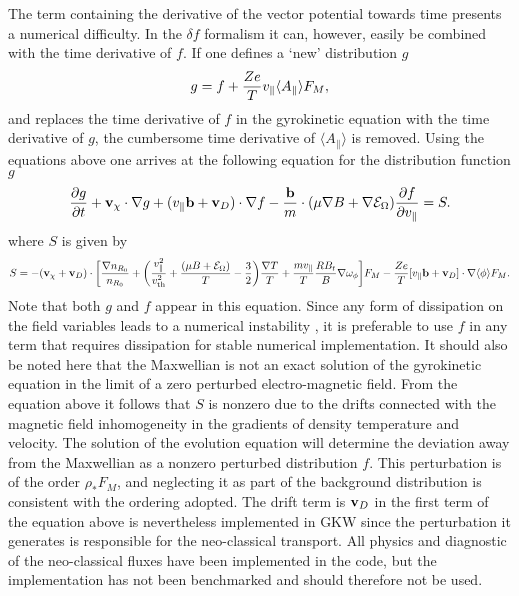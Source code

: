 The term containing the derivative of the vector potential towards time presents a numerical difficulty. 
In the $\delta f$ formalism it can, however, easily be combined with the time derivative of $f$. If one defines a `new' distribution $g$ 
\begin{equation} 
g = f + {Z e \over T} v_\parallel \langle A_\parallel \rangle F_M ,
\end{equation}
and replaces the time derivative of $f$ in the gyrokinetic equation with the time derivative of $g$, the cumbersome 
time derivative of $\langle A_\parallel \rangle $ is removed. 
Using the equations above one arrives at the following equation for the distribution function $g$
\begin{equation} 
{\partial g \over \partial t} + {\bf v}_\chi \cdot \nabla g  + (v_\parallel {\bf b} + {\bf v}_D) \cdot \nabla f  
-{{\bf b} \over m}\cdot(\mu \nabla B + \nabla \mathcal{E}_\Omega){\partial f \over \partial v_\parallel} = S. 
\label{Vlasov}
\end{equation}
where $S$ is given by
\begin{equation}
S =  - ({\bf v}_\chi + {\bf v}_D) \cdot \biggl [ {\nabla n_{R_0} \over n_{R_0}} + \biggl ( {v_\parallel^2 \over v_{\rm th}^2 } 
+ {(\mu B + \mathcal{E}_\Omega) \over T} - {3 \over 2} \biggr ) {\nabla T \over T} + {m v_\parallel \over T} {R B_t \over B }\nabla \omega_\phi \biggr ] F_M -  
{Ze \over T} [ v_\parallel {\bf b} + {\bf v}_D ] \cdot \nabla \langle \phi \rangle  F_M .
\label{source} 
\end{equation}
Note that both $g$ and $f$ appear in this equation. Since any form of dissipation on the field variables 
leads to a numerical instability \cite{CAN03}, it is preferable to use $f$ in any term that requires 
dissipation for stable numerical implementation.  
It should also be noted here that the Maxwellian is not an exact solution of the gyrokinetic equation in the limit of a zero 
perturbed electro-magnetic field. 
From the equation above it follows that $S$ is nonzero due to the drifts connected with the magnetic field inhomogeneity 
in the gradients of density temperature and velocity. 
The solution of the evolution equation will determine the deviation away from the Maxwellian as a nonzero perturbed
distribution $f$. 
This perturbation is of the order $\rho_* F_M$, and neglecting it as part of the background distribution is consistent with 
the ordering adopted. 
The drift term is ${\bf v}_D$ in the first term of the equation above is nevertheless implemented in GKW since the perturbation 
it generates is responsible for the neo-classical transport. All physics and diagnostic of the neo-classical fluxes have been 
implemented in the code, but the implementation has not been benchmarked and should therefore not be used.   

